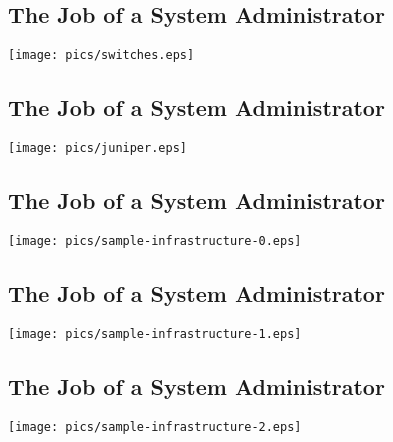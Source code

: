 \documentclass[xga]{xdvislides}
\begin{document}
\subsection{The Job of a System Administrator}
\vspace*{\fill}
\begin{center}
	\texttt{[image: pics/switches.eps]} \\
\end{center}
\vspace*{\fill}

\subsection{The Job of a System Administrator}
\vspace*{\fill}
\begin{center}
	\texttt{[image: pics/juniper.eps]} \\
\end{center}
\vspace*{\fill}

\subsection{The Job of a System Administrator}
\vspace*{\fill}
\begin{center}
	\texttt{[image: pics/sample-infrastructure-0.eps]} \\
\end{center}
\vspace*{\fill}

\subsection{The Job of a System Administrator}
\vspace*{\fill}
\begin{center}
	\texttt{[image: pics/sample-infrastructure-1.eps]} \\
\end{center}
\vspace*{\fill}

\subsection{The Job of a System Administrator}
\vspace*{\fill}
\begin{center}
	\texttt{[image: pics/sample-infrastructure-2.eps]} \\
\end{center}
\vspace*{\fill}
\end{document}
